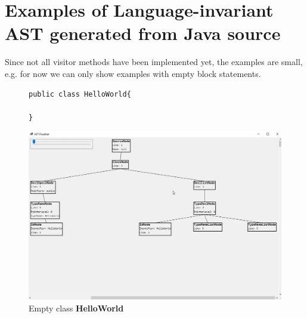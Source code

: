 \documentclass[a4paper]{article}
\begin{document}
\section{Examples of Language-invariant AST generated from Java source}
\label{sec:examples}

Since not all visitor methods have been implemented yet, the examples are small, e.g. for now we can only show examples with empty block statements.

\begin{figure}[h!]
\begin{center}
\begin{lstlisting}
public class HelloWorld{

}
\end{lstlisting}

\includegraphics[width=\textwidth]{ast}
\caption{Empty class \textbf{HelloWorld}}
\label{fig:ast1}
\end{center}
\end{figure}
\end{document}

